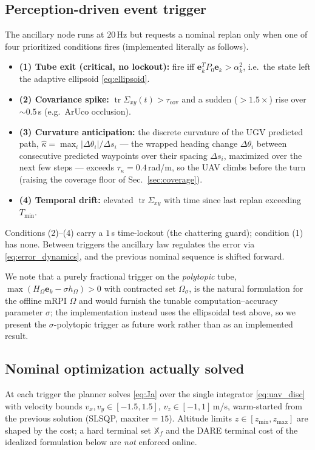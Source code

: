 \documentclass[letterpaper, 10 pt, conference]{ieeeconf}  %
\DeclareMathOperator{\tr}{tr}
\begin{document}
\subsection{Perception-driven event trigger}
\label{sec:trigger}
The ancillary node runs at $20$\,Hz but requests a nominal replan only when one of
four prioritized conditions fires (implemented literally as follows).
\begin{itemize}
\item \textbf{(1) Tube exit (critical, no lockout):} fire iff
$\mathbf{e}_k^T P_0\mathbf{e}_k>\alpha_k^2$, i.e.\ the state left the adaptive
ellipsoid \eqref{eq:ellipsoid}.
\item \textbf{(2) Covariance spike:} $\tr\Sigma_{xy}(t)>\tau_{\mathrm{cov}}$ and a
sudden ($>\!1.5\times$) rise over $\sim0.5$\,s (e.g.\ ArUco occlusion).
\item \textbf{(3) Curvature anticipation:} the discrete curvature of the UGV predicted path,
$\hat\kappa=\max_i |\Delta\theta_i|/\Delta s_i$ --- the wrapped heading change $\Delta\theta_i$
between consecutive predicted waypoints over their spacing $\Delta s_i$, maximized over the next
few steps --- exceeds $\tau_\kappa=0.4$\,rad/m, so the UAV climbs before the turn (raising the
coverage floor of Sec.~\ref{sec:coverage}).
\item \textbf{(4) Temporal drift:} elevated $\tr\Sigma_{xy}$ with time since last
replan exceeding $T_{\min}$.
\end{itemize}
Conditions (2)--(4) carry a $1$\,s time-lockout (the chattering guard);
condition (1) has none. Between triggers the ancillary law regulates the error
via \eqref{eq:error_dynamics}, and the previous nominal sequence is shifted
forward.

We note that a purely fractional trigger on the \emph{polytopic} tube,
$\max(H_\Omega\mathbf{e}_k-\sigma h_\Omega)>0$ with contracted set
$\Omega_\sigma$, is the natural formulation for the offline mRPI $\Omega$ and
would furnish the tunable computation--accuracy parameter $\sigma$; the
implementation instead uses the ellipsoidal test above, so we present the
$\sigma$-polytopic trigger as future work rather than as an implemented result.


\subsection{Nominal optimization actually solved}
At each trigger the planner solves \eqref{eq:Ja} over the single integrator
\eqref{eq:uav_disc} with velocity bounds $v_x,v_y\in[-1.5,1.5]$,
$v_z\in[-1,1]$\,m/s, warm-started from the previous solution (SLSQP,
$\text{maxiter}=15$). Altitude limits $z\in[z_{\min},z_{\max}]$ are shaped by the
cost; a hard terminal set $\mathbb{X}_f$ and the DARE terminal cost of the
idealized formulation below are \emph{not} enforced online.
\end{document}
